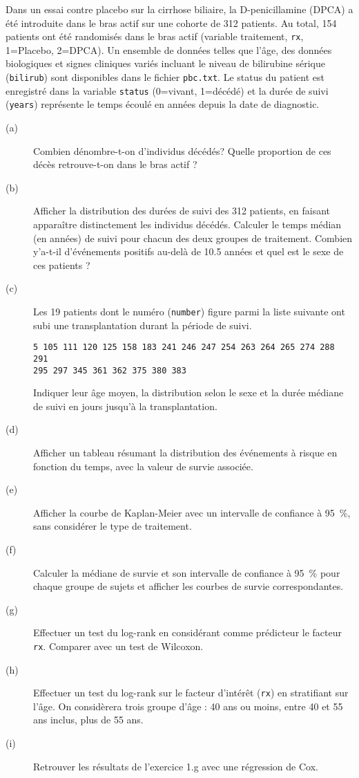 \begin{exo}\label{exo:7.3}
Dans un essai contre placebo sur la cirrhose biliaire, la D-penicillamine
(DPCA) a été introduite dans le bras actif sur une cohorte de 312
patients. Au total, 154 patients ont été randomisés dans le bras actif
(variable traitement, \texttt{rx}, 1=Placebo, 2=DPCA). Un ensemble de
données telles que l'âge, des données biologiques et signes cliniques variés
incluant le niveau de bilirubine sérique (\texttt{bilirub}) sont disponibles
dans le fichier \texttt{pbc.txt}.\autocite{vittinghoff05} Le status du
patient est enregistré dans la variable \texttt{status} (0=vivant, 1=décédé)
et la durée de suivi (\texttt{years}) représente le temps écoulé en années
depuis la date de diagnostic.
\begin{description}
\item[(a)] Combien dénombre-t-on d'individus décédés? Quelle proportion de
  ces décès retrouve-t-on dans le bras actif ?  
\item[(b)] Afficher la distribution des durées de suivi des 312 patients, en
  faisant apparaître distinctement les individus décédés. Calculer le temps
  médian (en années) de suivi pour chacun des deux groupes de
  traitement. Combien y'a-t-il d'événements positifs au-delà de 10.5 années
  et quel est le sexe de ces patients ?
\item[(c)] Les 19 patients dont le numéro (\texttt{number}) figure parmi la
  liste suivante ont subi une transplantation durant la période de suivi.
\begin{verbatim}  
5 105 111 120 125 158 183 241 246 247 254 263 264 265 274 288 291
295 297 345 361 362 375 380 383
\end{verbatim}   
  Indiquer leur âge moyen, la distribution selon le sexe et la durée médiane
  de suivi en jours jusqu'à la transplantation.
\item[(d)] Afficher un tableau résumant la distribution des événements à
  risque en fonction du temps, avec la valeur de survie associée.
\item[(e)] Afficher la courbe de Kaplan-Meier avec un intervalle de
  confiance à 95~\%, sans considérer le type de traitement.
\item[(f)] Calculer la médiane de survie et son intervalle de confiance à
  95~\% pour chaque groupe de sujets et afficher les courbes de survie
  correspondantes.
\item[(g)] Effectuer un test du log-rank en considérant comme prédicteur le
  facteur \texttt{rx}. Comparer avec un test de Wilcoxon.
\item[(h)] Effectuer un test du log-rank sur le facteur d'intérêt
  (\texttt{rx}) en stratifiant sur l'âge. On considèrera trois groupe
  d'âge : 40 ans ou moins, entre 40 et 55 ans inclus, plus de 55 ans.
\item[(i)] Retrouver les résultats de l'exercice 1.g avec une régression de
  Cox. 
\end{description}
\end{exo}